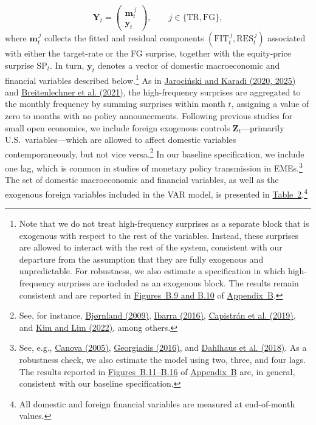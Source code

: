 \documentclass[\latexroot/\projectname]{subfiles}
\begin{document}
\[
\boldsymbol{Y}_t =
\begin{pmatrix}
\boldsymbol{m}_t^{\,j} \\
\boldsymbol{y}_t
\end{pmatrix},
\qquad j \in \{\text{TR}, \text{FG}\},
\]
where $\boldsymbol{m}_t^{\,j}$ collects the fitted and residual components $(\text{FIT}_t^{\,j}, \text{RES}_t^{\,j})$ associated with either the target-rate or the FG surprise, together with the equity-price surprise $\text{SP}_t$. In turn, $\boldsymbol{y}_t$ denotes a vector of domestic macroeconomic and financial variables described below.\footnote{Note that we do not treat high-frequency surprises as a separate block that is exogenous with respect to the rest of the variables. Instead, these surprises are allowed to interact with the rest of the system, consistent with our departure from the assumption that they are fully exogenous and unpredictable. For robustness, we also estimate a specification in which high-frequency surprises are included as an exogenous block. The results remain consistent and are reported in \hyperlink{Figure B.9}{Figures~B.9 and B.10} of \hyperlink{Appendix B}{Appendix~B}.} As in \hyperlink{JK (2020)}{Jarociński and Karadi (2020, 2025)} and \hyperlink{Breitenlechner (2021)}{Breitenlechner et al. (2021)}, the high-frequency surprises are aggregated to the monthly frequency by summing surprises within month $t$, assigning a value of zero to months with no policy announcements. Following previous studies for small open economies, we include foreign exogenous controls $\boldsymbol{Z}_t$—primarily U.S.\ variables—which are allowed to affect domestic variables contemporaneously, but not vice versa.\footnote{See, for instance, \hyperlink{Bjørnland (2009)}{Bjørnland (2009)}, \hyperlink{Ibarra (2016)}{Ibarra (2016)}, \hyperlink{Capistrán et al. (2019)}{Capistrán et al. (2019)}, and \hyperlink{Kim and Lim (2022)}{Kim and Lim (2022)}, among others.} In our baseline specification, we include one lag, which is common in studies of monetary policy transmission in EMEs.\footnote{See, e.g., \hyperlink{Canova (2005)}{Canova (2005)}, \hyperlink{Georgiadis (2016)}{Georgiadis (2016)}, and \hyperlink{Dahlhaus et al. (2018)}{Dahlhaus et al. (2018)}. As a robustness
check, we also estimate the model using two, three, and four lags. The results reported in \hyperlink{Figure B.11}{Figures~B.11--B.16} of \hyperlink{Appendix B}{Appendix~B} are, in general,
consistent with our baseline specification.} The set of domestic macroeconomic and financial variables, as well as the exogenous foreign variables included in the VAR model, is presented in \hyperlink{Table 3}{Table~2}.\footnote{All domestic and foreign financial variables are measured at end-of-month values.}
\end{document}
